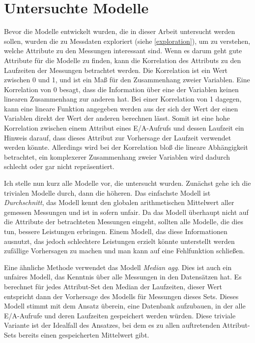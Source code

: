 \documentclass[
	12pt,
	a4paper,
	BCOR10mm,
	DIV14,
	listof=totoc,
	bibliography=totoc,
	headsepline
]{scrreprt}
\begin{document}
\section{Untersuchte Modelle}
\label{impl:modelle}
Bevor die Modelle entwickelt wurden, die in dieser Arbeit untersucht werden sollen, wurden die zu Messdaten exploriert (siehe \ref{exploration}), um zu verstehen, welche Attribute zu den Messungen interessant sind.
Wenn es darum geht gute Attribute für die Modelle zu finden, kann die Korrelation des Attributs zu den Laufzeiten der Messungen betrachtet werden. Die Korrelation ist ein Wert zwischen 0 und 1, und ist ein Maß für den Zusammenhang zweier Variablen. Eine Korrelation von 0 besagt, dass die Information über eine der Variablen keinen linearen Zusammenhang zur anderen hat. Bei einer Korrelation von 1 dagegen, kann eine lineare Funktion angegeben werden aus der sich der Wert der einen Variablen direkt der Wert der anderen berechnen lässt. Somit ist eine hohe Korrelation zwischen einem Attribut eines E/A-Aufrufs und dessen Laufzeit ein Hinweis darauf, dass dieses Attribut zur Vorhersage der Laufzeit verwendet werden könnte. 
Allerdings wird bei der Korrelation bloß die lineare Abhängigkeit betrachtet, ein komplexerer Zusammenhang zweier Variablen wird dadurch schlecht oder gar nicht repräsentiert.

Ich stelle nun kurz alle Modelle vor, die untersucht wurden. Zunächst gehe ich die trivialen Modelle durch, dann die höheren.
Das einfachste Modell ist \textit{Durchschnitt}, das Modell kennt den globalen arithmetischen Mittelwert aller gemessen Messungen und ist in sofern unfair. Da das Modell überhaupt nicht auf die Attribute der betrachteten Messungen eingeht, sollten alle Modelle, die dies tun, bessere Leistungen erbringen. Einem Modell, das diese Informationen ausnutzt, das jedoch schlechtere Leistungen erzielt könnte unterstellt werden zufällige Vorhersagen zu machen und man kann auf eine Fehlfunktion schließen.

Eine ähnliche Methode verwendet das Modell \textit{Median agg}. Dies ist auch ein unfaires Modell, das Kenntnis über alle Messungen in den Datensätzen hat. Es berechnet für jedes Attribut-Set den Median der Laufzeiten, dieser Wert entspricht dann der Vorhersage des Modells für Messungen dieses Sets.
Dieses Modell stimmt mit dem Ansatz überein, eine Datenbank aufzubauen, in der alle E/A-Aufrufe und deren Laufzeiten gespeichert werden würden.
Diese triviale Variante ist der Idealfall des Ansatzes, bei dem es zu allen auftretenden Attribut-Sets bereits einen gespeicherten Mittelwert gibt.
\end{document}
